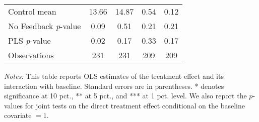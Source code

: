 \begin{table}[ht]
{\begin{threeparttable}
\begin{tabular}{l*{4}{c}}
Control mean    &    13.66         &    14.87         &     0.54         &     0.12         \\
No Feedback \emph{p}-value&     0.09         &     0.51         &     0.21         &     0.21         \\
PLS \emph{p}-value&     0.02         &     0.17         &     0.33         &     0.17         \\
Observations    &      231         &      231         &      209         &      209         \\
\bottomrule \end{tabular} \begin{tablenotes}[flushleft] \footnotesize \item \emph{Notes:} This table reports OLS estimates of the treatment effect and its interaction with baseline. Standard errors are in parentheses. * denotes significance at 10 pct., ** at 5 pct., and *** at 1 pct. level. We also report the \(p\)-values for joint tests on the direct treatment effect conditional on the baseline covariate $= 1$. \end{tablenotes} \end{threeparttable} } \end{table}

